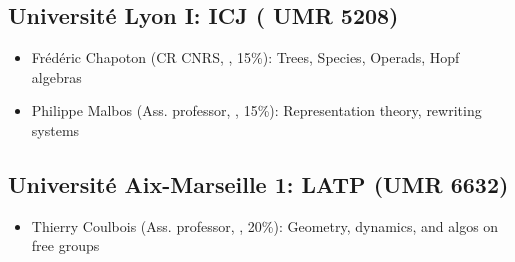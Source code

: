 \vspace{-1.2ex}
\subsection*{Université Lyon I: ICJ (%
  UMR 5208)}
\begin{itemize}
\item Frédéric Chapoton (CR CNRS, \MATH, 15\%): %
  Trees, Species, Operads, Hopf algebras
\item Philippe Malbos (Ass. professor, \MATH, 15\%): %
  Representation theory, %
  rewriting systems%
\end{itemize}



\vspace{-1.2ex}
\subsection*{Université Aix-Marseille 1: LATP (UMR 6632)}
\begin{itemize}
\item Thierry Coulbois (Ass. professor, \MATH, 20\%):
  Geometry, dynamics, and algos on free groups
\end{itemize}
